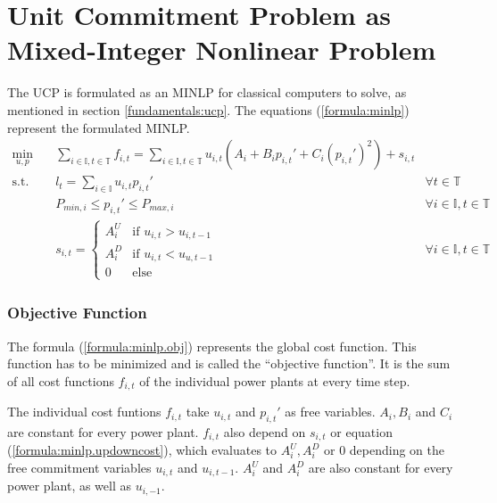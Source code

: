 \section{Unit Commitment Problem as Mixed-Integer Nonlinear Problem}
\label{approach:minlp}

The UCP is formulated as an MINLP for classical computers to solve,
as mentioned in section \ref{fundamentals:ucp}.
The equations (\ref{formula:minlp}) represent the formulated MINLP.
\begin{subequations}
\label{formula:minlp}
\begin{align}
  \min_{u, p} \quad &
  \sum_{i \in \mathbb{I}, t \in \mathbb{T}} f_{i, t}
  = \sum_{i \in \mathbb{I}, t \in \mathbb{T}}
    u_{i, t} (A_i + B_i p_{i, t}' + C_i (p_{i, t}')^2) + s_{i, t}
  \label{formula:minlp.obj}
  \\
  \text{s.t.} \quad & l_t = \sum_{i \in \mathbb{I}} u_{i, t} p_{i, t}' \quad &
  \forall t \in \mathbb{T}
  \label{formula:minlp.load}
  \\
  & P_{min, i} \leq p_{i, t}' \leq P_{max, i} \quad &
  \forall i \in \mathbb{I}, t \in \mathbb{T}
  \label{formula:minlp.power}
  \\
  & s_{i, t} = \begin{cases}
    A_i^U & \text{if } u_{i, t} > u_{i, t-1} \\
    A_i^D & \text{if } u_{i, t} < u_{u, t-1} \\
    0 & \text{else}
  \end{cases} \quad &
  \forall i \in \mathbb{I}, t \in \mathbb{T}
  \label{formula:minlp.updowncost}
\end{align}
\end{subequations}

\subsubsection{Objective Function}

The formula (\ref{formula:minlp.obj}) represents the global cost function.
This function has to be minimized and is called the ``objective function''.
It is the sum of all cost functions $f_{i, t}$ of the individual power plants at every time step.

The individual cost funtions $f_{i, t}$ take $u_{i, t}$ and $p_{i, t}'$ as free variables.
$A_i, B_i$ and $C_i$ are constant for every power plant.
$f_{i, t}$ also depend on $s_{i, t}$ or equation (\ref{formula:minlp.updowncost}),
which evaluates to $A_i^U, A_i^D$ or $0$ depending on the free commitment variables $u_{i, t}$ and $u_{i, t-1}$.
$A_i^U$ and $A_i^D$ are also constant for every power plant,
as well as $u_{i, -1}$.

